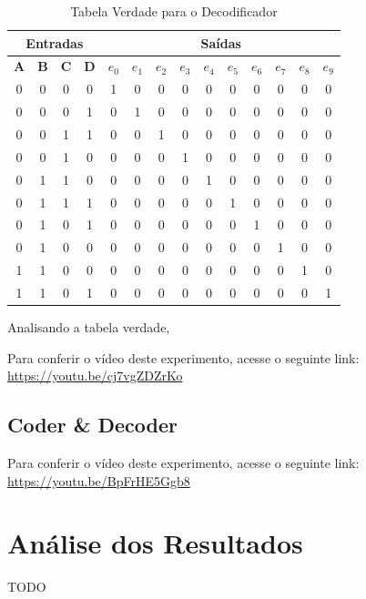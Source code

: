 \documentclass[12pt]{article}
\begin{document}
\begin{table}[H]
    \centering
    \caption{Tabela Verdade para o Decodificador}
    \begin{tabular}{|c|c|c|c||c|c|c|c|c|c|c|c|c|c|}\hline
    \multicolumn{4}{|c||}{Entradas} & \multicolumn{10}{|c|}{Saídas} \\\hline
    \textbf{A} & \textbf{B} & \textbf{C} & \textbf{D} & \textbf{$e_{0}$} & \textbf{$e_{1}$} & \textbf{$e_{2}$} & \textbf{$e_{3}$} & \textbf{$e_{4}$} & \textbf{$e_{5}$} & \textbf{$e_{6}$} & \textbf{$e_{7}$} & \textbf{$e_{8}$} & \textbf{$e_{9}$} \\\hline
    0 & 0 & 0 & 0 & 1 & 0 & 0 & 0 & 0 & 0 & 0 & 0 & 0 & 0 \\\hline
    0 & 0 & 0 & 1 & 0 & 1 & 0 & 0 & 0 & 0 & 0 & 0 & 0 & 0 \\\hline
    0 & 0 & 1 & 1 & 0 & 0 & 1 & 0 & 0 & 0 & 0 & 0 & 0 & 0 \\\hline
    0 & 0 & 1 & 0 & 0 & 0 & 0 & 1 & 0 & 0 & 0 & 0 & 0 & 0 \\\hline
    0 & 1 & 1 & 0 & 0 & 0 & 0 & 0 & 1 & 0 & 0 & 0 & 0 & 0 \\\hline
    0 & 1 & 1 & 1 & 0 & 0 & 0 & 0 & 0 & 1 & 0 & 0 & 0 & 0 \\\hline
    0 & 1 & 0 & 1 & 0 & 0 & 0 & 0 & 0 & 0 & 1 & 0 & 0 & 0 \\\hline
    0 & 1 & 0 & 0 & 0 & 0 & 0 & 0 & 0 & 0 & 0 & 1 & 0 & 0 \\\hline
    1 & 1 & 0 & 0 & 0 & 0 & 0 & 0 & 0 & 0 & 0 & 0 & 1 & 0 \\\hline
    1 & 1 & 0 & 1 & 0 & 0 & 0 & 0 & 0 & 0 & 0 & 0 & 0 & 1 \\\hline
    \end{tabular}\label{tab:tabela_and}
\end{table}

Analisando a tabela verdade,

Para conferir o vídeo deste experimento, acesse o seguinte link:
\href{https://youtu.be/cj7vgZDZrKo}{https://youtu.be/cj7vgZDZrKo}

\subsection{Coder \& Decoder}\label{sec:2.5}

Para conferir o vídeo deste experimento, acesse o seguinte link:
\href{https://youtu.be/BpFrHE5Ggb8}{https://youtu.be/BpFrHE5Ggb8}

\section{Análise dos Resultados}
\label{sec:resultados}
TODO
\end{document}

